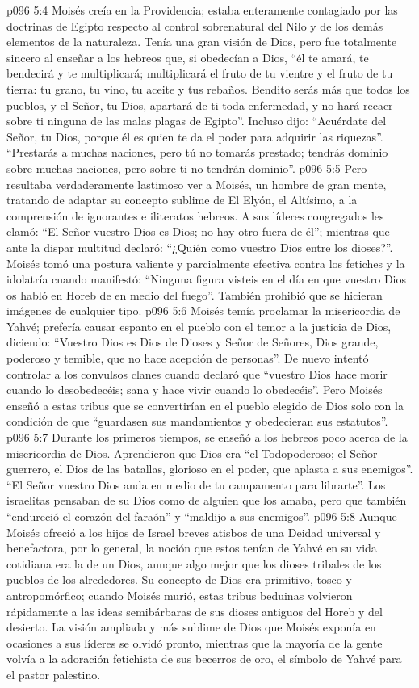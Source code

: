 \vs p096 5:4 \pc Moisés creía en la Providencia; estaba enteramente contagiado por las doctrinas de Egipto respecto al control sobrenatural del Nilo y de los demás elementos de la naturaleza. Tenía una gran visión de Dios, pero fue totalmente sincero al enseñar a los hebreos que, si obedecían a Dios, “él te amará, te bendecirá y te multiplicará; multiplicará el fruto de tu vientre y el fruto de tu tierra: tu grano, tu vino, tu aceite y tus rebaños. Bendito serás más que todos los pueblos, y el Señor, tu Dios, apartará de ti toda enfermedad, y no hará recaer sobre ti ninguna de las malas plagas de Egipto”. Incluso dijo: “Acuérdate del Señor, tu Dios, porque él es quien te da el poder para adquirir las riquezas”. “Prestarás a muchas naciones, pero tú no tomarás prestado; tendrás dominio sobre muchas naciones, pero sobre ti no tendrán dominio”.
\vs p096 5:5 \pc Pero resultaba verdaderamente lastimoso ver a Moisés, un hombre de gran mente, tratando de adaptar su concepto sublime de El Elyón, el Altísimo, a la comprensión de ignorantes e iliteratos hebreos. A sus líderes congregados les clamó: “El Señor vuestro Dios es Dios; no hay otro fuera de él”; mientras que ante la dispar multitud declaró: “¿Quién como vuestro Dios entre los dioses?”. Moisés tomó una postura valiente y parcialmente efectiva contra los fetiches y la idolatría cuando manifestó: “Ninguna figura visteis en el día en que vuestro Dios os habló en Horeb de en medio del fuego”. También prohibió que se hicieran imágenes de cualquier tipo.
\vs p096 5:6 Moisés temía proclamar la misericordia de Yahvé; prefería causar espanto en el pueblo con el temor a la justicia de Dios, diciendo: “Vuestro Dios es Dios de Dioses y Señor de Señores, Dios grande, poderoso y temible, que no hace acepción de personas”. De nuevo intentó controlar a los convulsos clanes cuando declaró que “vuestro Dios hace morir cuando lo desobedecéis; sana y hace vivir cuando lo obedecéis”. Pero Moisés enseñó a estas tribus que se convertirían en el pueblo elegido de Dios solo con la condición de que “guardasen sus mandamientos y obedecieran sus estatutos”.
\vs p096 5:7 Durante los primeros tiempos, se enseñó a los hebreos poco acerca de la misericordia de Dios. Aprendieron que Dios era “el Todopoderoso; el Señor guerrero, el Dios de las batallas, glorioso en el poder, que aplasta a sus enemigos”. “El Señor vuestro Dios anda en medio de tu campamento para librarte”. Los israelitas pensaban de su Dios como de alguien que los amaba, pero que también “endureció el corazón del faraón” y “maldijo a sus enemigos”.
\vs p096 5:8 Aunque Moisés ofreció a los hijos de Israel breves atisbos de una Deidad universal y benefactora, por lo general, la noción que estos tenían de Yahvé en su vida cotidiana era la de un Dios, aunque algo mejor que los dioses tribales de los pueblos de los alrededores. Su concepto de Dios era primitivo, tosco y antropomórfico; cuando Moisés murió, estas tribus beduinas volvieron rápidamente a las ideas semibárbaras de sus dioses antiguos del Horeb y del desierto. La visión ampliada y más sublime de Dios que Moisés exponía en ocasiones a sus líderes se olvidó pronto, mientras que la mayoría de la gente volvía a la adoración fetichista de sus becerros de oro, el símbolo de Yahvé para el pastor palestino.
